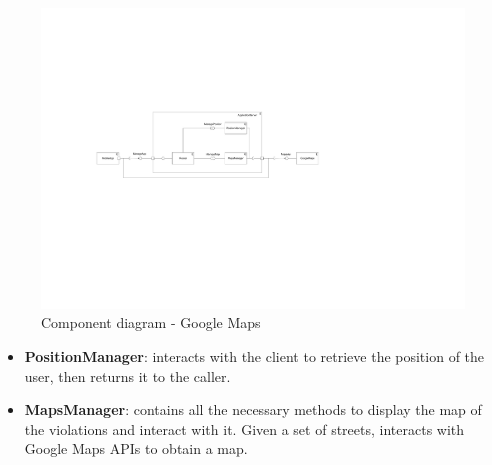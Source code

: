 \documentclass[12pt,a4paper]{report}
\begin{document}
	\begin{figure}[H]
				\includegraphics[scale = 0.4, center]{ComponentDiagramMaps}
				\caption{Component diagram - Google Maps}
	\end{figure}
		\begin{itemize}
			\item\textbf{PositionManager}: interacts with the client to retrieve the position of the user, then returns it to the caller.
			\item\textbf{MapsManager}: contains all the necessary methods to display the map of the violations and interact with it. Given a set of streets, 
			interacts with Google Maps APIs to obtain a map. 
		\end{itemize}
	
\end{document}
